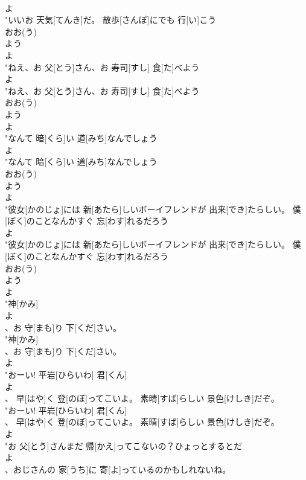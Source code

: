 \documentclass[8pt]{extreport}
\begin{document}
\begin{CJK}{UTF8}{min}
\\	よ
\\	"いいお 天気[てんき]だ。 散歩[さんぽ]にでも 行[い]こう
\\	おお(う) 
\\	よう	
\\	よ
\\	"ねえ、お 父[とう]さん、お 寿司[すし] 食[た]べよう
\\	よ
\\	"ねえ、お 父[とう]さん、お 寿司[すし] 食[た]べよう
\\	おお(う) 
\\	よう	
\\	よ
\\	"なんて 暗[くら]い 道[みち]なんでしょう
\\	よ
\\	"なんて 暗[くら]い 道[みち]なんでしょう
\\	おお(う) 
\\	よう	
\\	よ
\\	"彼女[かのじょ]には 新[あたら]しいボーイフレンドが 出来[でき]たらしい。 僕[ぼく]のことなんかすぐ 忘[わす]れるだろう
\\	よ
\\	"彼女[かのじょ]には 新[あたら]しいボーイフレンドが 出来[でき]たらしい。 僕[ぼく]のことなんかすぐ 忘[わす]れるだろう
\\	おお(う) 
\\	よう	
\\	よ
\\	"神[かみ]
\\	よ
\\	、お 守[まも]り 下[くだ]さい。
\\	"神[かみ]
\\	、お 守[まも]り 下[くだ]さい。
\\	よ
\\	"おーい! 平岩[ひらいわ] 君[くん]
\\	よ
\\	、 早[はや]く 登[のぼ]ってこいよ。 素晴[すば]らしい 景色[けしき]だぞ。
\\	"おーい! 平岩[ひらいわ] 君[くん]
\\	、 早[はや]く 登[のぼ]ってこいよ。 素晴[すば]らしい 景色[けしき]だぞ。
\\	よ
\\	"お 父[とう]さんまだ 帰[かえ]ってこないの？ひょっとするとだ
\\	よ
\\	、おじさんの 家[うち]に 寄[よ]っているのかもしれないね。

\end{CJK}
\end{document}

